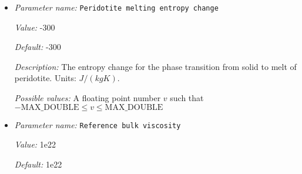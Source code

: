 \begin{itemize}
{\it Default:} 1e3


{\it Description:} Because the operator splitting scheme is used, the porosity field can not be set to a new equilibrium melt fraction instantly, but the model has to provide a melting time scale instead. This time scale defines how fast melting happens, or more specifically, the parameter defines the time after which the deviation of the porosity from the equilibrium melt fraction will be reduced to a fraction of $1/e$. So if the melting time scale is small compared to the time step size, the reaction will be so fast that the porosity is very close to the equilibrium melt fraction after reactions are computed. Conversely, if the melting time scale is large compared to the time step size, almost no melting and freezing will occur.

Also note that the melting time scale has to be larger than or equal to the reaction time step used in the operator splitting scheme, otherwise reactions can not be computed. Units: yr or s, depending on the ``Use years in output instead of seconds'' parameter.


{\it Possible values:} A floating point number $v$ such that $0 \leq v \leq \text{MAX\_DOUBLE}$
\item {\it Parameter name:} {\tt Peridotite melting entropy change}
\label{parameters:Material model/Melt simple/Peridotite melting entropy change}
\label{parameters:Material_20model/Melt_20simple/Peridotite_20melting_20entropy_20change}


{\it Value:} -300


{\it Default:} -300


{\it Description:} The entropy change for the phase transition from solid to melt of peridotite. Units: $J/(kg K)$.


{\it Possible values:} A floating point number $v$ such that $-\text{MAX\_DOUBLE} \leq v \leq \text{MAX\_DOUBLE}$
\item {\it Parameter name:} {\tt Reference bulk viscosity}
\label{parameters:Material model/Melt simple/Reference bulk viscosity}
\label{parameters:Material_20model/Melt_20simple/Reference_20bulk_20viscosity}


{\it Value:} 1e22


{\it Default:} 1e22



\end{itemize}
